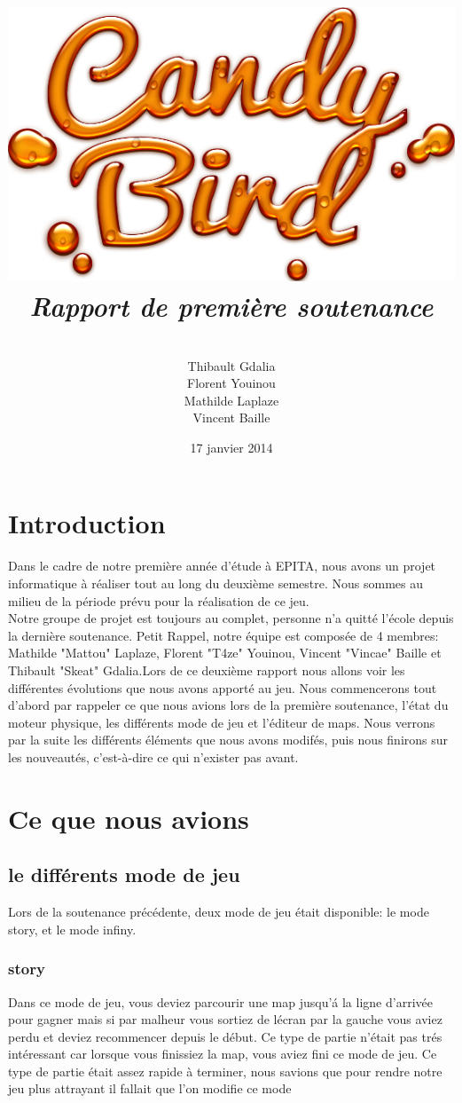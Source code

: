 \documentclass [11pt]{report}
\title{
	\includegraphics[scale=0.43]{images/Logojeu.png}
	 \\\vspace{20mm}
	\textbf{\Huge \itshape Rapport de premi\`ere soutenance  }
	}
\author{ \\\vspace{2mm}
	Thibault Gdalia\\\vspace{2mm}
	Florent Youinou\\\vspace{2mm}
	Mathilde Laplaze\\\vspace{2mm}
	Vincent Baille \\\vspace{30mm}
	}
\date{17 janvier 2014}
\begin{document}
\thispagestyle{fancy}
\renewcommand{\baselinestretch}{0.001}
\maketitle
\tableofcontents
\chapter*{Introduction} 
Dans le cadre de notre premi\`ere ann\'ee d'\'etude \`a EPITA, nous avons un projet informatique \`a r\'ealiser tout au long du deuxi\`eme semestre. Nous sommes au milieu de la p\'eriode pr\'evu pour la r\'ealisation de ce jeu. \\

Notre groupe de projet est toujours au complet, personne n'a quitt\'e l'\'ecole depuis la derni\`ere soutenance. Petit Rappel, notre \'equipe est compos\'ee de 4 membres: Mathilde "Mattou" Laplaze, Florent "T4ze" Youinou, Vincent "Vincae" Baille et Thibault "Skeat" Gdalia.Lors de ce deuxi\`eme rapport nous allons voir les diff\'erentes \'evolutions que nous avons apport\'e au jeu. Nous commencerons tout d'abord par rappeler ce que nous avions lors de la premi\`ere soutenance, l'\'etat du moteur physique, les diff\'erents mode de jeu et l'\'editeur de maps. Nous verrons par la suite les diff\'erents \'el\'ements que nous avons modif\'es, puis nous finirons sur les nouveaut\'es, c'est-\`a-dire ce qui n'exister pas avant.

\chapter{Ce que nous avions}
	\section{le diff\'erents mode de jeu}
		Lors de la soutenance pr\'ec\'edente, deux mode de jeu \'etait disponible: le mode story, et le mode infiny.
		\subsection{story}
			Dans ce mode de jeu, vous deviez parcourir une map jusqu'\'a la ligne d'arriv\'ee pour gagner mais si par malheur vous sortiez de l\'ecran par la gauche vous aviez perdu et deviez recommencer depuis le d\'ebut. Ce type de partie n'\'etait pas tr\'es int\'eressant car lorsque vous finissiez la map, vous aviez fini ce mode de jeu. Ce type de partie \'etait assez rapide \`a terminer, nous savions que pour rendre notre jeu plus attrayant il fallait que l'on modifie ce mode 
\end{document}

